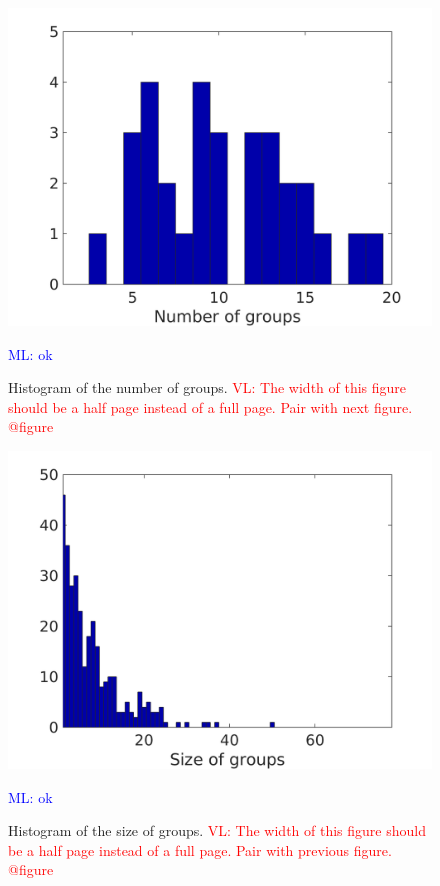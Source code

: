 \documentclass{bmcart}
\newcommand{\ml}[1]{\textcolor{blue}{ML: #1}}
\newcommand{\vl}[1]{\textcolor{red}{VL: #1}}
\begin{document}
\begin{backmatter}
\begin{figure}
\center
\includegraphics[width = \textwidth]{figures/nbc.png}
\caption{Histogram of the number of groups.
\vl{The width of this figure should be a half page instead of a full page. Pair with next figure. @figure}}
\ml{ok}
\label{fig:xp2nbGroup}
\end{figure}

\begin{figure}
\center
\includegraphics[width = \textwidth]{figures/sbc.png}
\caption{Histogram of the size of groups.
\vl{The width of this figure should be a half page instead of a full page. Pair with previous figure. @figure}}
\ml{ok}
\label{fig:xp2sizeGroup}
\end{figure}



\end{backmatter}
\end{document}
